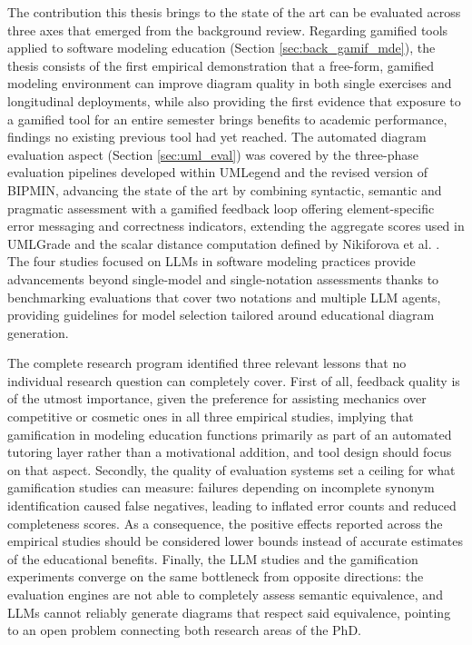 The contribution this thesis brings to the state of the art can be evaluated across three axes that emerged from the background review. Regarding gamified tools applied to software modeling education (Section \ref{sec:back_gamif_mde}), the thesis consists of the first empirical demonstration that a free-form, gamified modeling environment can improve diagram quality in both single exercises and longitudinal deployments, while also providing the first evidence that exposure to a gamified tool for an entire semester brings benefits to academic performance, findings no existing previous tool had yet reached. The automated diagram evaluation aspect (Section \ref{sec:uml_eval}) was covered by the three-phase evaluation pipelines developed within UMLegend and the revised version of BIPMIN, advancing the state of the art by combining syntactic, semantic and pragmatic assessment with a gamified feedback loop offering element-specific error messaging and correctness indicators, extending the aggregate scores used in UMLGrade \cite{farias2020whats} and the scalar distance computation defined by Nikiforova et al. \cite{nikiforova2015approach}. The four studies focused on LLMs in software modeling practices provide advancements beyond single-model and single-notation assessments \cite{camara2023assessment, chen2023automated} thanks to benchmarking evaluations that cover two notations and multiple LLM agents, providing guidelines for model selection tailored around educational diagram generation. 

The complete research program identified three relevant lessons that no individual research question can completely cover. First of all, feedback quality is of the utmost importance, given the preference for assisting mechanics over competitive or cosmetic ones in all three empirical studies, implying that gamification in modeling education functions primarily as part of an automated tutoring layer rather than a motivational addition, and tool design should focus on that aspect. Secondly, the quality of evaluation systems set a ceiling for what gamification studies can measure: failures depending on incomplete synonym identification caused false negatives, leading to inflated error counts and reduced completeness scores. As a consequence, the positive effects reported across the empirical studies should be considered lower bounds instead of accurate estimates of the educational benefits. Finally, the LLM studies and the gamification experiments converge on the same bottleneck from opposite directions: the evaluation engines are not able to completely assess semantic equivalence, and LLMs cannot reliably generate diagrams that respect said equivalence, pointing to an open problem connecting both research areas of the PhD.

